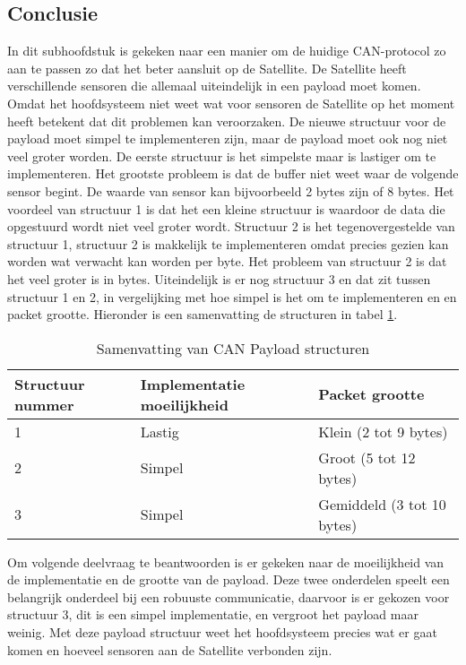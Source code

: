 \subsection{Conclusie}
In dit subhoofdstuk is gekeken naar een manier om de huidige CAN-protocol zo aan te passen zo dat het beter aansluit op de Satellite. De Satellite heeft verschillende sensoren die allemaal uiteindelijk in een payload moet komen. Omdat het hoofdsysteem niet weet wat voor sensoren de Satellite op het moment heeft betekent dat dit problemen kan veroorzaken. De nieuwe structuur voor de payload moet simpel te implementeren zijn, maar de payload moet ook nog niet veel groter worden. De eerste structuur is het simpelste maar is lastiger om te implementeren. Het grootste probleem is dat de buffer niet weet waar de volgende sensor begint. De waarde van sensor kan bijvoorbeeld 2 bytes zijn of 8 bytes. Het voordeel van structuur 1 is dat het een kleine structuur is waardoor de data die opgestuurd wordt niet veel groter wordt. Structuur 2 is het tegenovergestelde van structuur 1, structuur 2 is makkelijk te implementeren omdat precies gezien kan worden wat verwacht kan worden per byte. Het probleem van structuur 2 is dat het veel groter is in bytes. Uiteindelijk is er nog structuur 3 en dat zit tussen structuur 1 en 2, in vergelijking met hoe simpel is het om te implementeren en en packet grootte. Hieronder is een samenvatting de structuren in tabel \ref{tab:samenvattingstructuur}.

\begin{table}[h!]
	\centering
	\caption{Samenvatting van CAN Payload structuren}
	\label{tab:samenvattingstructuur}
	\begin{tabular}{lll}
	\toprule
		Structuur nummer & Implementatie moeilijkheid & Packet grootte             \\ \midrule
		1                & Lastig                     & Klein (2 tot 9 bytes)      \\
		2                & Simpel                     & Groot (5 tot 12 bytes)     \\
		3                & Simpel                     & Gemiddeld (3 tot 10 bytes) \\ \bottomrule
	\end{tabular}%
\end{table}

\noindent Om volgende deelvraag te beantwoorden is er gekeken naar de moeilijkheid van de implementatie en de grootte van de payload. Deze twee onderdelen speelt een belangrijk onderdeel bij een robuuste communicatie, daarvoor is er gekozen voor structuur 3, dit is een simpel implementatie, en vergroot het payload maar weinig. Met deze payload structuur weet het hoofdsysteem precies wat er gaat komen en hoeveel sensoren aan de Satellite verbonden zijn.